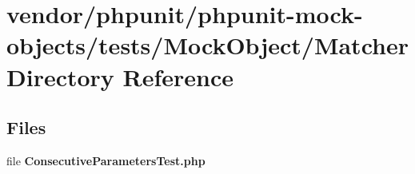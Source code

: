 \section{vendor/phpunit/phpunit-\/mock-\/objects/tests/\+Mock\+Object/\+Matcher Directory Reference}
\label{dir_8a4d8c11c7fb2789ba69b64ea0fdc01c}
\subsection*{Files}
\begin{DoxyCompactItemize}
\item 
file {\bf Consecutive\+Parameters\+Test.\+php}
\end{DoxyCompactItemize}
